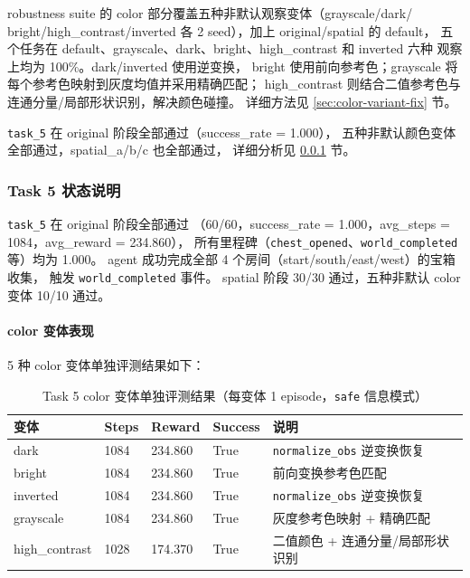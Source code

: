 \documentclass[12pt,a4paper]{ctexart}
\begin{document}
robustness suite 的 color 部分覆盖五种非默认观察变体（grayscale/dark/
bright/high\_contrast/inverted 各 2 seed），加上 original/spatial 的 default，
五个任务在 default、grayscale、dark、bright、high\_contrast 和 inverted 六种
观察上均为 100\%。dark/inverted 使用逆变换，
bright 使用前向参考色；grayscale 将每个参考色映射到灰度均值并采用精确匹配；
high\_contrast 则结合二值参考色与连通分量/局部形状识别，解决颜色碰撞。
详细方法见 \ref{sec:color-variant-fix} 节。

\texttt{task\_5} 在 original 阶段全部通过（success\_rate = 1.000），
五种非默认颜色变体全部通过，spatial\_a/b/c 也全部通过，
详细分析见 \ref{sec:task5-status} 节。

\subsubsection{Task 5 状态说明}
\label{sec:task5-status}

\texttt{task\_5} 在 original 阶段全部通过
（60/60，success\_rate = 1.000，avg\_steps = 1084，avg\_reward = 234.860），
所有里程碑（\texttt{chest\_opened}、\texttt{world\_completed} 等）均为 1.000。
agent 成功完成全部 4 个房间（start/south/east/west）的宝箱收集，
触发 \texttt{world\_completed} 事件。
spatial 阶段 30/30 通过，五种非默认 color 变体 10/10 通过。

\paragraph{color 变体表现}

5 种 color 变体单独评测结果如下：

\begin{table}[H]
\centering
\begin{tabular}{p{}p{}p{}p{}p{}}
\toprule
变体 & Steps & Reward & Success & 说明 \\
\midrule
dark & 1084 & 234.860 & True & \texttt{normalize\_obs} 逆变换恢复 \\
bright & 1084 & 234.860 & True & 前向变换参考色匹配 \\
inverted & 1084 & 234.860 & True & \texttt{normalize\_obs} 逆变换恢复 \\
grayscale & 1084 & 234.860 & True & 灰度参考色映射 + 精确匹配 \\
high\_contrast & 1028 & 174.370 & True & 二值颜色 + 连通分量/局部形状识别 \\
\bottomrule
\end{tabular}
\caption{Task 5 color 变体单独评测结果（每变体 1 episode，\texttt{safe} 信息模式）}
\label{tab:task5-color}
\end{table}
\end{document}
